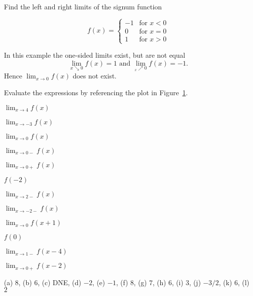 \documentclass[../main.tex]{subfiles}
\begin{document}
\begin{example}
Find the left and right limits of the signum function

  \begin{minipage}[c]{0.5\textwidth}
    \[
    f(x) =
    \begin{cases}
      -1 & \text{for $x<0$}\\ 0 & \text{for $x=0$}\\ 1 & \text{for $x>0$}
    \end{cases}
    \]
  \end{minipage}
  \begin{minipage}[c]{0.2\textwidth}
    \begin{figure}[H]
    \centering
    
    \end{figure}
  \end{minipage}

  In this example the one-sided limits exist, but are not equal
  \[
  \lim_{x\searrow0}f(x) = 1 \text{ and } \lim_{_x\nearrow0}f(x) = -1.
  \]
  Hence $\lim_{x\to 0} f(x)$ does not exist.
\end{example}


\begin{example} Evaluate the expressions by referencing the plot in Figure~\ref{plot:piecewise-exercise}.
\begin{figure}[H]
  \centering
  
  \label{plot:piecewise-exercise}
\end{figure}

\begin{enumerate}
\begin{multicols}{3}
\item $\lim_{x\to 4} f(x)$
\item $\lim_{x\to -3} f(x)$
\item $\lim_{x\to 0} f(x)$
\item $\lim_{x\to 0-} f(x)$
\item $\lim_{x\to 0+} f(x)$
\item $f(-2)$
\item $\lim_{x\to 2-} f(x)$
\item $\lim_{x\to -2-} f(x)$
\item $\lim_{x\to 0} f(x+1)$
\item $f(0)$
\item $\lim_{x\to 1-} f(x-4)$
\item $\lim_{x\to 0+} f(x-2)$
\end{multicols}
\end{enumerate}

(a) $8$, (b) $6$, (c) DNE,
(d) $-2$, (e) $-1$, (f) $8$,
(g) $7$, (h) $6$, (i) $3$,
(j) $-3/2$, (k) $6$, (l) $2$
\end{example}
\end{document}
